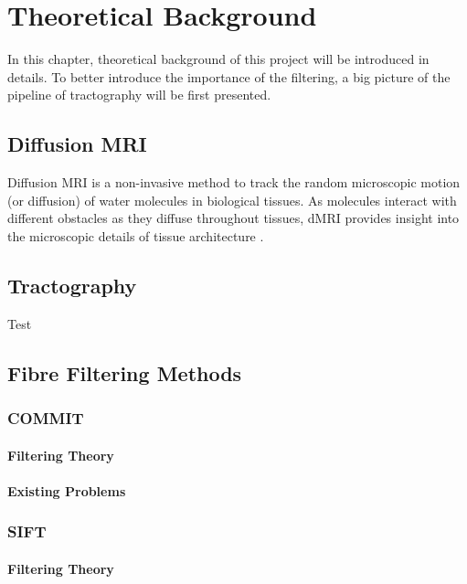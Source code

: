 \chapter{Theoretical Background}


In this chapter, theoretical background of this project will be introduced in details. To better introduce the importance of the filtering, a big picture of the pipeline of tractography will be first presented. 

\section{Diffusion MRI}

Diffusion MRI is a non-invasive method to track the random microscopic motion (or diffusion) of water molecules in biological tissues. 
As molecules interact with different obstacles as they diffuse throughout tissues, dMRI provides insight into the microscopic details of tissue architecture \cite{newmanChapterMorphologicalBrain2014}. 


\section{Tractography}

Test \autocite{dhollanderFixelbasedAnalysisDiffusion2021}


\section{Fibre Filtering Methods}

\subsection{COMMIT}

\subsubsection{Filtering Theory}

\subsubsection{Existing Problems}

\subsection{SIFT}

\subsubsection{Filtering Theory}


